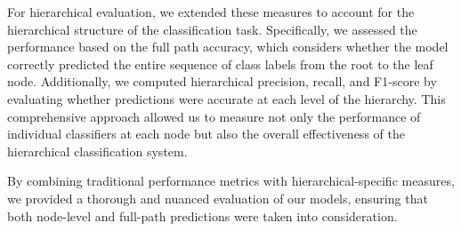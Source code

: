For hierarchical evaluation, we extended these measures to account for the hierarchical structure of the classification task. Specifically, we assessed the performance based on the full path accuracy, which considers whether the model correctly predicted the entire sequence of class labels from the root to the leaf node. Additionally, we computed hierarchical precision, recall, and F1-score by evaluating whether predictions were accurate at each level of the hierarchy. This comprehensive approach allowed us to measure not only the performance of individual classifiers at each node but also the overall effectiveness of the hierarchical classification system.

By combining traditional performance metrics with hierarchical-specific measures, we provided a thorough and nuanced evaluation of our models, ensuring that both node-level and full-path predictions were taken into consideration.
